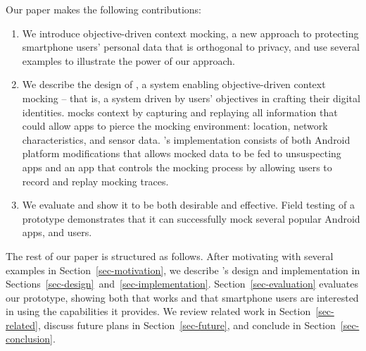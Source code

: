 Our paper makes the following contributions:

\begin{enumerate}

\item We introduce objective-driven context mocking, a new approach to
protecting smartphone users' personal data that is orthogonal to privacy, and
use several examples to illustrate the power of our approach.

\item We describe the design of \PocketMocker{}, a system enabling
objective-driven context mocking -- that is, a system driven by users'
objectives in crafting their digital identities.  \PocketMocker{} mocks context
by capturing and replaying all information that could allow apps to pierce the
mocking environment: location, network characteristics, and sensor data.
\PocketMocker{}'s implementation consists of both Android platform
modifications that allows mocked data to be fed to unsuspecting apps and an app
that controls the mocking process by allowing users to record and replay
mocking traces.

\item We evaluate \PocketMocker{} and show it to be both desirable and
effective. Field testing of a \PocketMocker{} prototype demonstrates that it
can successfully mock several popular Android apps, and users.

\end{enumerate}

The rest of our paper is structured as follows. After motivating
\PocketMocker{} with several examples in Section~\ref{sec-motivation}, we
describe \PocketMocker{}'s design and implementation in
Sections~\ref{sec-design}~and~\ref{sec-implementation}.
Section~\ref{sec-evaluation} evaluates our \PocketMocker{} prototype, showing
both that \PocketMocker{} works and that smartphone users are interested in
using the capabilities it provides. We review related work in
Section~\ref{sec-related}, discuss future plans in Section~\ref{sec-future},
and conclude in Section~\ref{sec-conclusion}.
